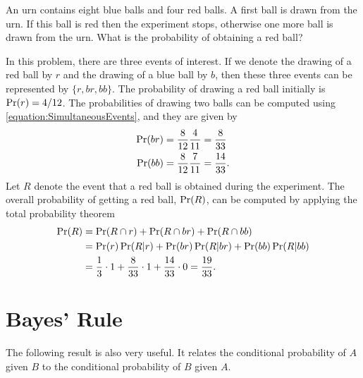 \begin{example}
An urn contains eight blue balls and four red balls.
A first ball is drawn from the urn.
If this ball is red then the experiment stops, otherwise one more ball is drawn from the urn.
What is the probability of obtaining a red ball?

In this problem, there are three events of interest.
If we denote the drawing of a red ball by $r$ and the drawing of a blue ball by $b$, then these three events can be represented by $\{ r, br, bb \}$.
The probability of drawing a red ball initially is $\Pr (r) = 4/12$.
The probabilities of drawing two balls can be computed using \eqref{equation:SimultaneousEvents}, and they are given by
\begin{align*}
\Pr (br) &= \frac{8}{12} \frac{4}{11} = \frac{8}{33} \\
\Pr (bb) &= \frac{8}{12} \frac{7}{11} = \frac{14}{33} .
\end{align*}
Let $R$ denote the event that a red ball is obtained during the experiment.
The overall probability of getting a red ball, $\Pr (R)$, can be computed by applying the total probability theorem
\begin{equation*}
\begin{split}
\Pr (R) &= \Pr (R \cap r) + \Pr (R \cap br) + \Pr (R \cap bb) \\
&= \Pr(r) \Pr (R|r) + \Pr(br) \Pr (R|br) + \Pr(bb) \Pr (R|bb) \\
&= \frac{1}{3} \cdot 1 + \frac{8}{33} \cdot 1 + \frac{14}{33} \cdot 0
= \frac{19}{33} .
\end{split}
\end{equation*}
\end{example}


\section{Bayes' Rule}

The following result is also very useful.
It relates the conditional probability of $A$ given $B$ to the conditional probability of $B$ given $A$.

